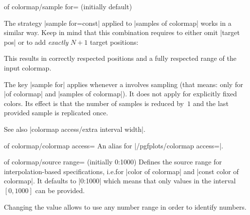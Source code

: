 {\begin{enumerate}
\begin{pgfplotskey}{of colormap/sample for= (initially default)}
\begin{itemize}
                    The strategy |sample for=const| applied to
                    |samples of colormap| works in a similar way. Keep in mind
                    that this combination requires to either omit |target pos|
                    or to add \emph{exactly} $N+1$ target positions:
\begin{codeexample}[]
\pgfplotscolorbardrawstandalone[
    colormap={example}{
        samples of colormap={
            5 of viridis,
            target pos={0,100,500,850,950,1000},
            sample for=const,
        },
    },
    colorbar horizontal,
    colormap access=const]
\end{codeexample}

                    This results in correctly respected positions and a fully
                    respected range of the input colormap.
            \end{itemize}

            The key |sample for| applies whenever a 
            involves sampling (that means: only for |of colormap| and
            |samples of colormap|). It does not apply for explicitly fixed
            colors. Its effect is that the number of samples is reduced by~$1$
            and the last provided sample is replicated once.

            See also |colormap access/extra interval width|.
        \end{pgfplotskey}

        \begin{pgfplotskey}{of colormap/colormap access=}
             An alias for |/pgfplots/colormap access=|.
        \end{pgfplotskey}

        \begin{pgfplotskey}{of colormap/source range= (initially 0:1000)}
             Defines the source range for interpolation-based specifications,
             i.e.\@ for |color of colormap| and |const color of colormap|. It
             defaults to |0:1000| which means that only values in the interval
             $[0,1000]$ can be provided.

             Changing the value allows to use any number range in order to
             identify numbers.
\begin{codeexample}[]
\pgfplotscolorbardrawstandalone[
    colormap={example}{
        colors of colormap={
            -30000,-10000,0,100000,110000 of viridis,
            source range=-30000:120000,
        },
    },
    colorbar horizontal,
    colormap access=const]
\end{codeexample}
        \end{pgfplotskey}


\end{enumerate}}
